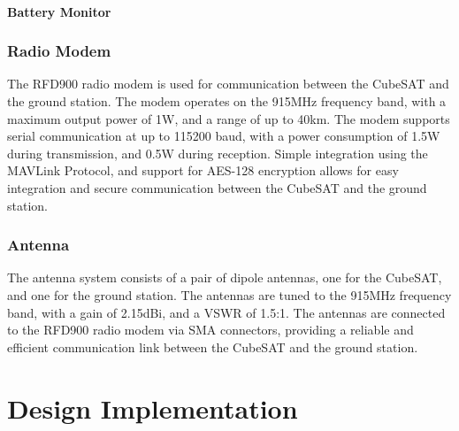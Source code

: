 \documentclass{report}
\begin{document}
                \subsubsection{Battery Monitor}
            \subsection{Radio Modem}
                The RFD900 radio modem is used for communication between the CubeSAT and the ground station.
                The modem operates on the 915MHz frequency band, with a maximum output power of 1W, and a range of up to 40km.
                The modem supports serial communication at up to 115200 baud, with a power consumption of 1.5W during transmission,
                and 0.5W during reception.
                Simple integration using the MAVLink Protocol, and 
                support for AES-128 encryption allows for easy integration and secure communication between the CubeSAT and the ground station.
            \subsection{Antenna}
                The antenna system consists of a pair of dipole antennas, one for the CubeSAT, and one for the ground station.
                The antennas are tuned to the 915MHz frequency band, with a gain of 2.15dBi, and a VSWR of 1.5:1.
                The antennas are connected to the RFD900 radio modem via SMA connectors, providing a reliable and efficient
                communication link between the CubeSAT and the ground station.
    \chapter{Design Implementation}
\end{document}
